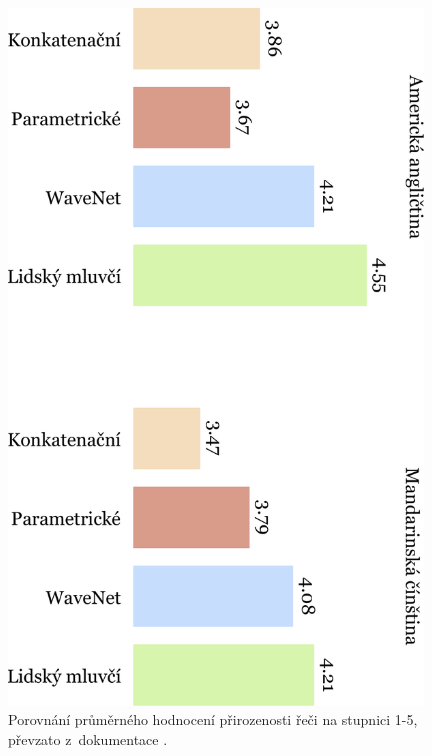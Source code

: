 \begin{figure}[h]
    \centering
    \includegraphics[angle=90, width=0.98\textwidth]{../img/wavenet-comparison.pdf}
    \caption{Porovnání průměrného hodnocení přirozenosti řeči na stupnici 1-5, převzato z~dokumentace
        \citet[upraveno a přeloženo autorem]{google_tts}.}\label{img-wavenet}
\end{figure}